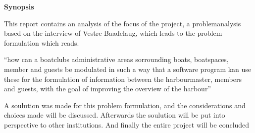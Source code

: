 \begin{center}\textbf{Synopsis}\\ \end{center}

This report contains an analysis of the focus of the project, a problemanalysis based on the interview of Vestre Baadelaug, which leads to the problem formulation which reads.

\enquote{how can a boatclubs administrative areas sorrounding boats, boatspaces, member and guests be modulated in such a way that a software program kan use these for the formulation of information between the harbourmaster, members and guests, with the goal of improving the overview of the harbour}

A soulution was made for this problem formulation, and the considerations and choices made will be discussed. Afterwards the soulution will be put into perspective to other institutions. And finally the entire project will be concluded